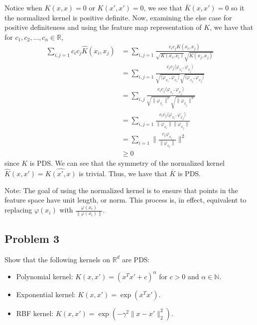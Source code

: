 \documentclass[12pt]{article}
\begin{document}
Notice when $K(x, x) = 0$ or $K(x', x') = 0$, we see that $\bar{K}(x, x') = 0$ so it the
normalized kernel is positive definite. Now, examining the else case for positive definiteness and
using the feature map representation of $K$, we have that for $c_1, c_2, \dots, c_n \in \mathbb{R}$,
\begin{align*}
    \sum_{i,j=1}c_ic_j\hat{K}(x_i,x_j) &= \sum_{i,j=1}\frac{c_ic_jK(x_i, x_j)}{\sqrt{K(x_i, x_i)} \sqrt{K(x_j, x_j)}} \\
    &=\sum_{i,j=1}\frac{c_ic_j\langle\varphi_{x_i},\varphi_{x_j}\rangle}{\sqrt{\langle\varphi_{x_i},\varphi_{x_i}\rangle}\sqrt{\langle\varphi_{x_j},\varphi_{x_j}\rangle}} \\
    &=\sum_{i,j}\frac{c_ic_j\langle\varphi_{x_i},\varphi_{x_j}\rangle}{\sqrt{\|\varphi_{x_i}\|^2}\sqrt{\|\varphi_{x_j}\|^2}} \\
    &=\sum_{i,j=1}\frac{c_ic_j\langle\varphi_{x_i},\varphi_{x_j}\rangle}{\|\varphi_{x_i}\| \|\varphi_{x_j}\|} \\
    &=\sum_{i=1}\|\frac{c_i\varphi_{x_i}}{\|\varphi_{x_i}\|}\|^2 \\
    &\geq 0
\end{align*}
since $K$ is PDS. We can see that the symmetry of the normalized kernel $\hat{K}(x,x')=\hat{K(x',x)}$ is trivial. 
Thus, we have that $\bar{K}$ is PDS.

Note: The goal of using the normalized kernel is to ensure that points in the feature space have unit length, or norm.
This process is, in effect, equivalent to replacing $\varphi(x_i)$ with $\frac{\varphi(x_i)}{\|\varphi(x_i)\|}$.


\subsection*{Problem 3} %
\begin{mdframed}
    Show that the following kernels on $\mathbb{R}^{d}$ are PDS:
    \begin{itemize}
        \item Polynomial kernel: $K(x, x')=(x^{T} x'+c)^{\alpha}$ for $c>0$ and $\alpha \in \mathbb{N}$.
        \item Exponential kernel: $K(x, x')=\exp (x^Tx')$.
        \item RBF kernel: $K(x, x')=\exp (-\gamma^{2}\|x-x'\|_2^2)$.
    \end{itemize}
\end{mdframed}
\end{document}
